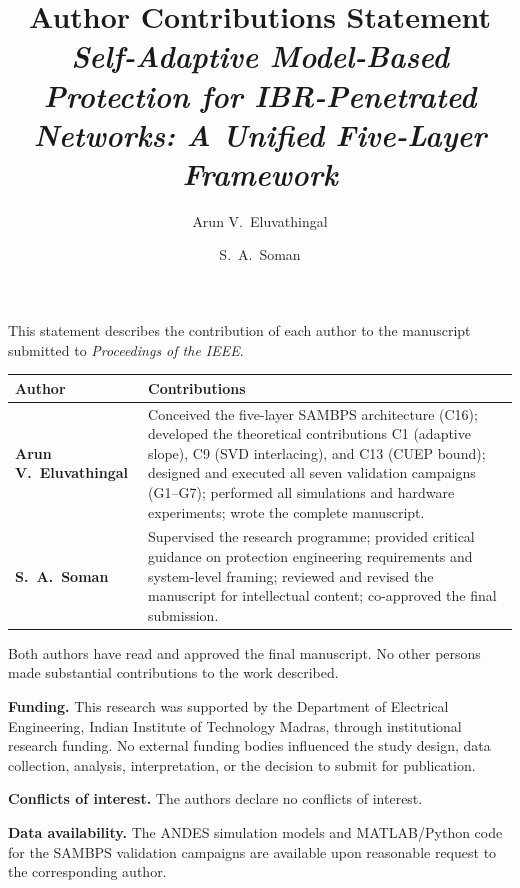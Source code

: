 \documentclass[11pt,a4paper]{article}
\title{Author Contributions Statement\\[4pt]
\large\textit{Self-Adaptive Model-Based Protection for IBR-Penetrated
Networks: A Unified Five-Layer Framework}}
\author{Arun V.\ Eluvathingal \and S.\ A.\ Soman}
\date{}
\begin{document}
\maketitle
\thispagestyle{empty}

This statement describes the contribution of each author to the
manuscript submitted to \textit{Proceedings of the IEEE}.

\bigskip
\begin{tabular}{@{}>{\bfseries}p{3.8cm}p{10cm}@{}}
\toprule
Author & Contributions \\
\midrule
Arun V.\ Eluvathingal &
  Conceived the five-layer SAMBPS architecture (C16);
  developed the theoretical contributions C1 (adaptive slope),
  C9 (SVD interlacing), and C13 (CUEP bound);
  designed and executed all seven validation campaigns (G1--G7);
  performed all simulations and hardware experiments;
  wrote the complete manuscript. \\[6pt]
S.\ A.\ Soman &
  Supervised the research programme;
  provided critical guidance on protection engineering requirements
  and system-level framing;
  reviewed and revised the manuscript for intellectual content;
  co-approved the final submission. \\
\bottomrule
\end{tabular}

\bigskip\noindent
Both authors have read and approved the final manuscript.
No other persons made substantial contributions to the work described.

\bigskip\noindent
\textbf{Funding.}
This research was supported by the Department of Electrical
Engineering, Indian Institute of Technology Madras, through
institutional research funding.  No external funding bodies
influenced the study design, data collection, analysis,
interpretation, or the decision to submit for publication.

\bigskip\noindent
\textbf{Conflicts of interest.}
The authors declare no conflicts of interest.

\bigskip\noindent
\textbf{Data availability.}
The ANDES simulation models and MATLAB/Python code for the
SAMBPS validation campaigns are available upon reasonable
request to the corresponding author.
\end{document}
